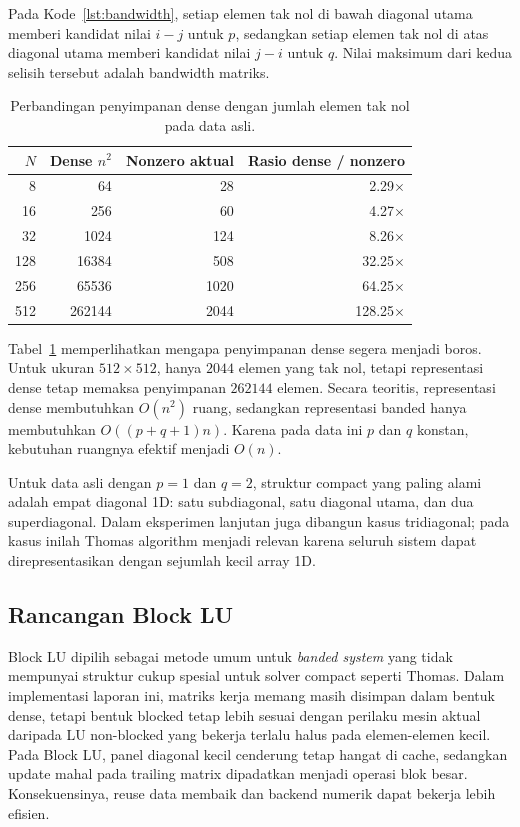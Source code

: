 \documentclass[12pt,a4paper]{article}
\begin{document}
Pada Kode~\ref{lst:bandwidth}, setiap elemen tak nol di bawah diagonal utama memberi kandidat nilai $i-j$ untuk $p$, sedangkan setiap elemen tak nol di atas diagonal utama memberi kandidat nilai $j-i$ untuk $q$. Nilai maksimum dari kedua selisih tersebut adalah bandwidth matriks.

\begin{table}[h]
\centering
\caption{Perbandingan penyimpanan dense dengan jumlah elemen tak nol pada data asli.}
\label{tab:bandwidth-storage}
\begin{tabular}{rrrr}
\toprule
$N$ & Dense $n^2$ & Nonzero aktual & Rasio dense / nonzero \\
\midrule
8   & 64     & 28   & 2.29$\times$ \\
16  & 256    & 60   & 4.27$\times$ \\
32  & 1024   & 124  & 8.26$\times$ \\
128 & 16384  & 508  & 32.25$\times$ \\
256 & 65536  & 1020 & 64.25$\times$ \\
512 & 262144 & 2044 & 128.25$\times$ \\
\bottomrule
\end{tabular}
\end{table}

Tabel~\ref{tab:bandwidth-storage} memperlihatkan mengapa penyimpanan dense segera menjadi boros. Untuk ukuran $512\times512$, hanya $2044$ elemen yang tak nol, tetapi representasi dense tetap memaksa penyimpanan $262144$ elemen. Secara teoritis, representasi dense membutuhkan $O(n^2)$ ruang, sedangkan representasi banded hanya membutuhkan $O((p+q+1)n)$. Karena pada data ini $p$ dan $q$ konstan, kebutuhan ruangnya efektif menjadi \textbf{$O(n)$}.

Untuk data asli dengan $p=1$ dan $q=2$, struktur compact yang paling alami adalah empat diagonal 1D: satu subdiagonal, satu diagonal utama, dan dua superdiagonal. Dalam eksperimen lanjutan juga dibangun kasus tridiagonal; pada kasus inilah Thomas algorithm menjadi relevan karena seluruh sistem dapat direpresentasikan dengan sejumlah kecil array 1D.

\subsection{Rancangan Block LU}
Block LU dipilih sebagai metode umum untuk \emph{banded system} yang tidak mempunyai struktur cukup spesial untuk solver compact seperti Thomas. Dalam implementasi laporan ini, matriks kerja memang masih disimpan dalam bentuk dense, tetapi bentuk blocked tetap lebih sesuai dengan perilaku mesin aktual daripada LU non-blocked yang bekerja terlalu halus pada elemen-elemen kecil. Pada Block LU, panel diagonal kecil cenderung tetap hangat di cache, sedangkan update mahal pada trailing matrix dipadatkan menjadi operasi blok besar. Konsekuensinya, reuse data membaik dan backend numerik dapat bekerja lebih efisien.
\end{document}
